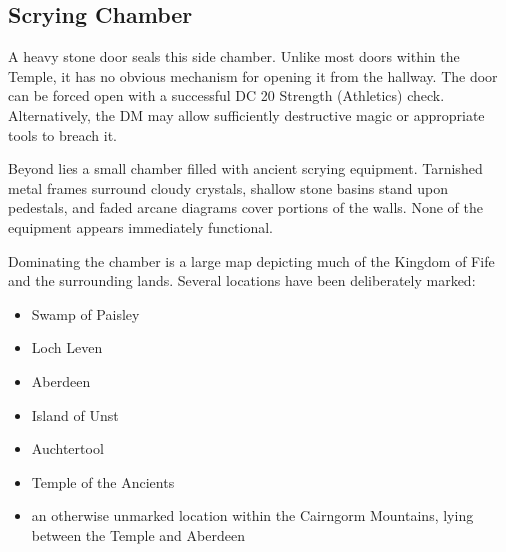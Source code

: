 \subsection*{ Scrying Chamber}
{\entryfont A heavy stone door seals this side chamber. Unlike most doors within the Temple, it has no obvious mechanism for opening it from the hallway. The door can be forced open with a successful DC 20 Strength (Athletics) check. Alternatively, the DM may allow sufficiently destructive magic or appropriate tools to breach it.

Beyond lies a small chamber filled with ancient scrying equipment. Tarnished metal frames surround cloudy crystals, shallow stone basins stand upon pedestals, and faded arcane diagrams cover portions of the walls. None of the equipment appears immediately functional.

Dominating the chamber is a large map depicting much of the Kingdom of Fife and the surrounding lands. Several locations have been deliberately marked:
\begin{itemize}
	\item Swamp of Paisley
	\item Loch Leven
	\item Aberdeen
	\item Island of Unst
	\item Auchtertool
	\item Temple of the Ancients
	\item an otherwise unmarked location within the Cairngorm Mountains, lying between the Temple and Aberdeen
\end{itemize}}

